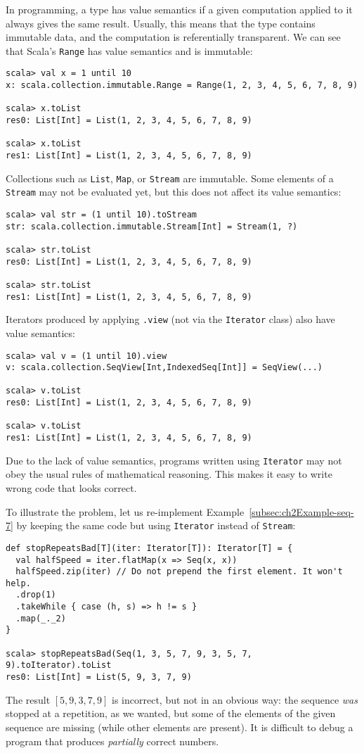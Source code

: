 In programming, a type has value semantics if a given computation
applied to it always gives the same result. Usually, this means that
the type contains immutable data, and the computation is referentially
transparent. We can see that Scala's \lstinline!Range! has value
semantics and is immutable:
\begin{lstlisting}
scala> val x = 1 until 10
x: scala.collection.immutable.Range = Range(1, 2, 3, 4, 5, 6, 7, 8, 9)

scala> x.toList
res0: List[Int] = List(1, 2, 3, 4, 5, 6, 7, 8, 9)

scala> x.toList
res1: List[Int] = List(1, 2, 3, 4, 5, 6, 7, 8, 9) 
\end{lstlisting}
Collections such as \lstinline!List!, \lstinline!Map!, or \lstinline!Stream!
are immutable. Some elements of a \lstinline!Stream! may not be evaluated
yet, but this does not affect its value semantics:
\begin{lstlisting}
scala> val str = (1 until 10).toStream
str: scala.collection.immutable.Stream[Int] = Stream(1, ?)

scala> str.toList
res0: List[Int] = List(1, 2, 3, 4, 5, 6, 7, 8, 9)

scala> str.toList
res1: List[Int] = List(1, 2, 3, 4, 5, 6, 7, 8, 9) 
\end{lstlisting}
Iterators produced by applying \lstinline!.view! (not via the \lstinline!Iterator!
class) also have value semantics:
\begin{lstlisting}
scala> val v = (1 until 10).view
v: scala.collection.SeqView[Int,IndexedSeq[Int]] = SeqView(...)

scala> v.toList
res0: List[Int] = List(1, 2, 3, 4, 5, 6, 7, 8, 9)

scala> v.toList
res1: List[Int] = List(1, 2, 3, 4, 5, 6, 7, 8, 9)
\end{lstlisting}

Due to the lack of value semantics, programs written using \lstinline!Iterator!
may not obey the usual rules of mathematical reasoning. This
makes it easy to write wrong code that looks correct.

To illustrate the problem, let us re-implement Example~\ref{subsec:ch2Example-seq-7}
by keeping the same code but using \lstinline!Iterator! instead of
\lstinline!Stream!:
\begin{lstlisting}
def stopRepeatsBad[T](iter: Iterator[T]): Iterator[T] = {
  val halfSpeed = iter.flatMap(x => Seq(x, x))
  halfSpeed.zip(iter) // Do not prepend the first element. It won't help.
  .drop(1)
  .takeWhile { case (h, s) => h != s }
  .map(_._2)
}

scala> stopRepeatsBad(Seq(1, 3, 5, 7, 9, 3, 5, 7, 9).toIterator).toList
res0: List[Int] = List(5, 9, 3, 7, 9)
\end{lstlisting}
The result $\left[5,9,3,7,9\right]$ is incorrect, but not in an obvious
way: the sequence \emph{was} stopped at a repetition, as we wanted,
but some of the elements of the given sequence are missing (while
other elements are present). It is difficult to debug a program that
produces \emph{partially} correct numbers.

